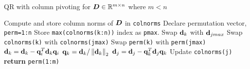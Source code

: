\documentclass[preprint,12pt,authoryear]{elsarticle}
\begin{document}
\begin{algorithm}
  \caption{QR with column pivoting for $\bm{D} \in \mathbb{R}^{m \times n}$ where $m < n$}\label{euclid}
  \begin{algorithmic}[1]
    \State Compute and store column norms of $\bm{D}$ in \texttt{colnorms} 
    \State Declare permutation vector, \texttt{perm=1:n}
      	\State Store \texttt{max(colnorms(k:n))} index as \texttt{pmax}.
      	\State Swap $\mathbf{d}_{k}$ with $\mathbf{d}_{jmax}$ 
      	\State Swap \texttt{colnorms(k)} with \texttt{colnorms(jmax)} 
      	\State Swap \texttt{perm(k)} with \texttt{perm(jmax)}
    		  \State $\mathbf{d}_{k} = \mathbf{d}_{k} - \mathbf{q}_{i}^T \mathbf{d}_{k} \mathbf{q}_{i}$ 
    		 \EndFor 
    	\EndIf
    	\State $\mathbf{q}_{k} = \mathbf{d}_{k} / \left\Vert \mathbf{d}_{k}\right\Vert _{2}$ 
        
        		\State $\mathbf{d}_{j} = \mathbf{d}_{j} - \mathbf{q}_{k}^T \mathbf{d}_{j} \mathbf{q}_{k}$
        		\State Update \texttt{colnorms(j)}
        	\EndFor
        \EndIf	
      \EndFor
      \State \textbf{return} \texttt{perm(1:m)}
    \EndProcedure
  \end{algorithmic}
\end{algorithm}
\end{document}

